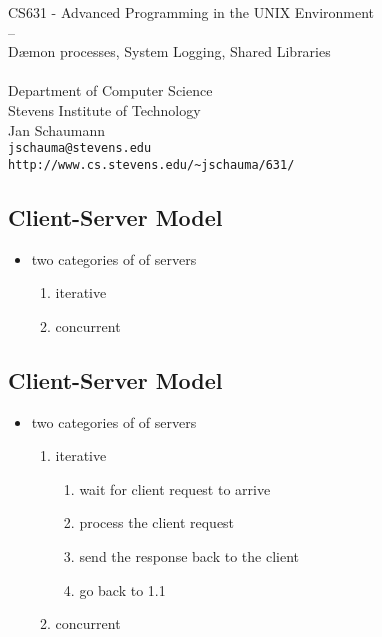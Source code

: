 \documentclass[xga]{xdvislides}
\begin{document}
\setfontphv

\lhead{\slidetitle}
\cfoot{\relax}
\rfoot{\Gray{\today}}

\vspace*{\fill}
\begin{center}
	\Hugesize
		CS631 - Advanced Programming in the UNIX Environment\\
		-- \\
		D\ae mon processes, System Logging, Shared Libraries\\
	\hspace*{5mm}\blueline\\ [1em]
	\Normalsize
		Department of Computer Science\\
		Stevens Institute of Technology\\
		Jan Schaumann\\
		\verb+jschauma@stevens.edu+\\
		\verb+http://www.cs.stevens.edu/~jschauma/631/+
\end{center}
\vspace*{\fill}

\subsection{Client-Server Model}
\begin{itemize}
	\item two categories of of servers
		\begin{enumerate}
			\item iterative
			\item concurrent
		\end{enumerate}
\end{itemize}

\subsection{Client-Server Model}
\begin{itemize}
	\item two categories of of servers
		\begin{enumerate}
			\item iterative
				\begin{enumerate}
					\item wait for client request to arrive
					\item process the client request
					\item send the response back to the client
					\item go back to 1.1
				\end{enumerate}
			\item concurrent
		\end{enumerate}
\end{itemize}
\end{document}
